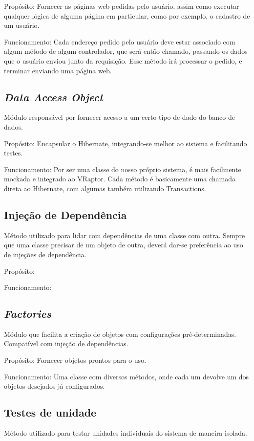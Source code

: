 \documentclass[11pt, a4paper]{article}
\begin{document}
            Propósito: Fornecer as páginas web pedidas pelo usuário, assim
			como executar qualquer lógica de alguma página em particular, como
			por exemplo, o cadastro de um usuário.

            Funcionamento: Cada endereço pedido pelo usuário deve estar associado
			com algum método de algum controlador, que será então chamado, passando
			os dados que o usuário enviou junto da requisição. Esse método irá
			processar o pedido, e terminar enviando uma página web.

        \subsection{\textit{Data Access Object}}
            Módulo responsável por fornecer acesso a um certo tipo de dado do
            banco de dados.

            Propósito: Encapsular o Hibernate, integrando-se melhor ao sistema
			e facilitando testes.

            Funcionamento: Por ser uma classe do nosso próprio sistema, é mais
			facilmente mockada e integrado ao VRaptor.
			Cada método é basicamente uma chamada direta ao Hibernate, com algumas
			também utilizando Transactions.

        \subsection{Injeção de Dependência}
            Método utilizado para lidar com dependências de uma classe com
            outra. Sempre que uma classe precisar de um objeto de outra,
            deverá dar-se preferência ao uso de injeções de dependência.

            Propósito: %

            Funcionamento: %

        \subsection{\textit{Factories}}
            Módulo que facilita a criação de objetos com configurações
            pré-determinadas. Compatível com injeção de dependências.

            Propósito: Fornecer objetos prontos para o uso.

            Funcionamento: Uma classe com diversos métodos, onde cada um
			devolve um dos objetos desejados já configurados.

        \subsection{Testes de unidade}
            Método utilizado para testar unidades individuais do sistema de
            maneira isolada.
\end{document}
